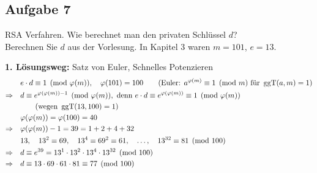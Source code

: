 \subsection{Aufgabe 7}

\begin{aufgabe}[Aufgabe 7]
RSA Verfahren. Wie berechnet man den privaten Schlüssel $d$?\\
Berechnen Sie $d$ aus der Vorlesung. In Kapitel 3 waren $m = 101$, $e = 13$.
\end{aufgabe}

\begin{loesung}
\textbf{1. Lösungsweg:} Satz von Euler, Schnelles Potenzieren
\begin{align*}
& e \cdot d \equiv 1 \pmod{\varphi(m)}, \quad \varphi(101) = 100 \qquad (\text{Euler: } a^{\varphi(m)} \equiv 1 \pmod m \text{ für } \operatorname{ggT}(a, m) = 1)\\
\Rightarrow\quad & d \equiv e^{\varphi(\varphi(m)) - 1} \pmod{\varphi(m)}, \text{ denn } e \cdot d \equiv e^{\varphi(\varphi(m))} \equiv 1 \pmod{\varphi(m)}\\ & \qquad (\text{wegen } \operatorname{ggT}(13, 100) = 1)\\
& \varphi(\varphi(m)) = \varphi(100) = 40\\
\Rightarrow\quad & \varphi(\varphi(m)) - 1 = 39 = 1 + 2 + 4 + 32\\
& 13,\quad 13^2 \equiv 69,\quad 13^4 \equiv 69^2 \equiv 61,\quad \dots,\quad 13^{32} \equiv 81 \pmod{100}\\
\Rightarrow\quad & d \equiv e^{39} = 13^{1} \cdot 13^{2} \cdot 13^{4} \cdot 13^{32} \pmod{100}\\
\Rightarrow\quad & d \equiv 13 \cdot 69 \cdot 61 \cdot 81 \equiv 77 \pmod{100}
\end{align*}


\end{loesung}
